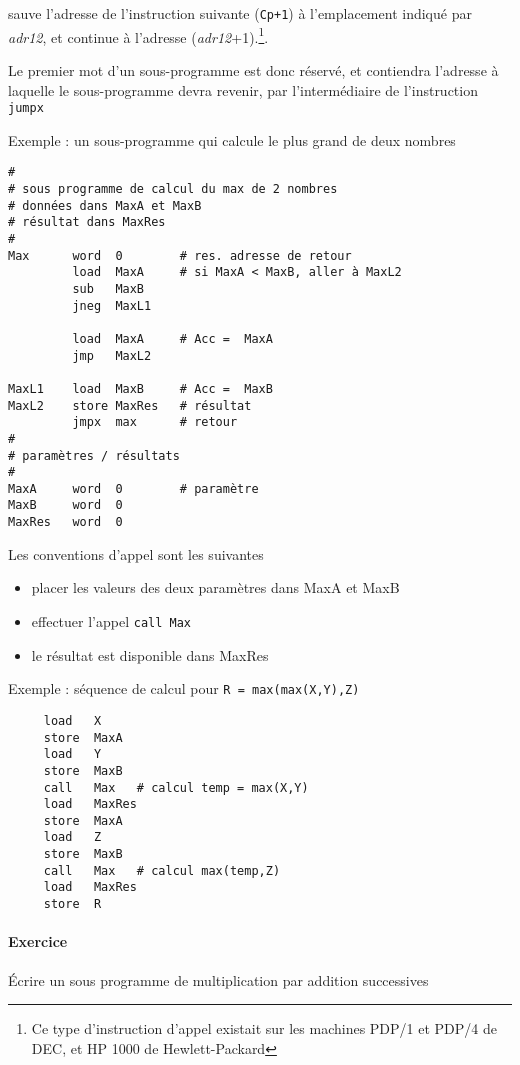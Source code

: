 \documentclass[10pt]{article}
\begin{document}
 sauve l'adresse de 
l'instruction suivante (\texttt{Cp+1}) à l'emplacement indiqué par 
 \emph{adr12}, et continue à l'adresse (\emph{adr12}+1).\footnote{Ce type 
d'instruction d'appel existait sur les machines PDP/1 et PDP/4 de DEC,
et HP 1000 de Hewlett-Packard}.

Le premier mot d'un sous-programme est donc réservé, et contiendra
l'adresse à laquelle le sous-programme devra revenir, par l'intermédiaire
de l'instruction \texttt{jumpx}

Exemple : un sous-programme qui calcule le plus grand de deux nombres

\begin{lstlisting}
#
# sous programme de calcul du max de 2 nombres
# données dans MaxA et MaxB
# résultat dans MaxRes
#
Max      word  0        # res. adresse de retour
         load  MaxA     # si MaxA < MaxB, aller à MaxL2 
         sub   MaxB
         jneg  MaxL1    

         load  MaxA     # Acc =  MaxA 
         jmp   MaxL2

MaxL1    load  MaxB     # Acc =  MaxB
MaxL2    store MaxRes   # résultat
         jmpx  max      # retour
#
# paramètres / résultats
#
MaxA     word  0        # paramètre
MaxB     word  0
MaxRes   word  0
\end{lstlisting}

Les conventions d'appel sont les suivantes
\begin{itemize}
\item placer les valeurs des deux paramètres dans MaxA et MaxB
\item effectuer l'appel \texttt{call Max}
\item le résultat est disponible dans MaxRes
\end{itemize}

Exemple : séquence de calcul pour \texttt{R = max(max(X,Y),Z)}
\begin{lstlisting}
     load   X
     store  MaxA
     load   Y
     store  MaxB
     call   Max   # calcul temp = max(X,Y)
     load   MaxRes
     store  MaxA
     load   Z
     store  MaxB
     call   Max   # calcul max(temp,Z)
     load   MaxRes
     store  R
\end{lstlisting}

\paragraph{Exercice} Écrire un sous programme de multiplication par addition successives
\end{document}
